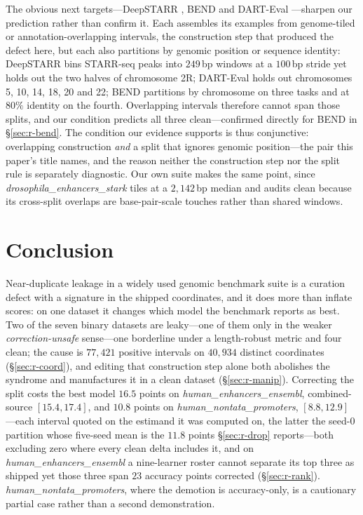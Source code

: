\documentclass[webpdf,modern,large,namedate]{oup-authoring-template}%
\begin{document}
The obvious next targets---DeepSTARR \citep{dealmeida2022deepstarr}, BEND \citep{marin2024bend} and DART-Eval \citep{patel2024darteval}---sharpen our prediction rather than confirm it. Each assembles its examples from genome-tiled or annotation-overlapping intervals, the construction step that produced the defect here, but each also partitions by genomic position or sequence identity: DeepSTARR bins STARR-seq peaks into $249$\,bp windows at a $100$\,bp stride yet holds out the two halves of chromosome 2R; DART-Eval holds out chromosomes 5, 10, 14, 18, 20 and 22; BEND partitions by chromosome on three tasks and at $80\%$ identity on the fourth. Overlapping intervals therefore cannot span those splits, and our condition predicts all three clean---confirmed directly for BEND in \S\ref{sec:r-bend}. The condition our evidence supports is thus conjunctive: overlapping construction \emph{and} a split that ignores genomic position---the pair this paper's title names, and the reason neither the construction step nor the split rule is separately diagnostic. Our own suite makes the same point, since \textit{drosophila\_enhancers\_stark} tiles at a $2{,}142$\,bp median and audits clean because its cross-split overlaps are base-pair-scale touches rather than shared windows.

\section{Conclusion}\label{sec:conclusion}

Near-duplicate leakage in a widely used genomic benchmark suite is a curation defect with a signature in the shipped coordinates, and it does more than inflate scores: on one dataset it changes which model the benchmark reports as best. Two of the seven binary datasets are leaky---one of them only in the weaker \emph{correction-unsafe} sense---one borderline under a length-robust metric and four clean; the cause is $77{,}421$ positive intervals on $40{,}934$ distinct coordinates (\S\ref{sec:r-coord}), and editing that construction step alone both abolishes the syndrome and manufactures it in a clean dataset (\S\ref{sec:r-manip}). Correcting the split costs the best model $16.5$ points on \textit{human\_enhancers\_ensembl}, combined-source $[15.4,17.4]$, and $10.8$ points on \textit{human\_nontata\_promoters}, $[8.8,12.9]$---each interval quoted on the estimand it was computed on, the latter the seed-$0$ partition whose five-seed mean is the $11.8$ points \S\ref{sec:r-drop} reports---both excluding zero where every clean delta includes it, and on \textit{human\_enhancers\_ensembl} a nine-learner roster cannot separate its top three as shipped yet those three span $23$ accuracy points corrected (\S\ref{sec:r-rank}). \textit{human\_nontata\_promoters}, where the demotion is accuracy-only, is a cautionary partial case rather than a second demonstration.
\end{document}
